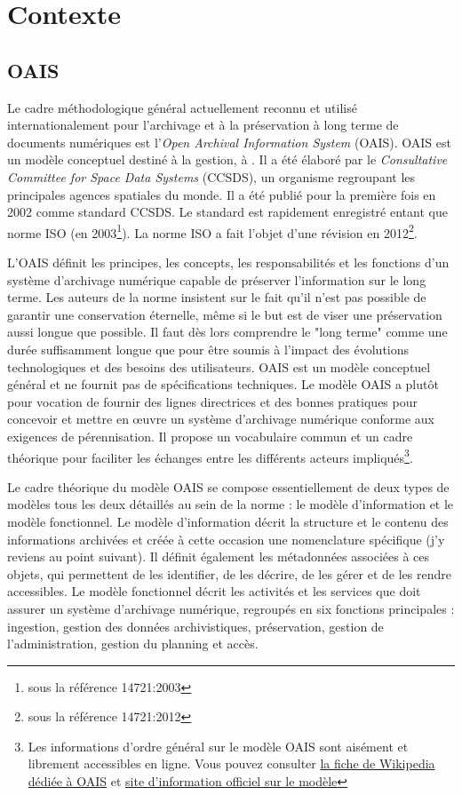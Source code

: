 \documentclass[12pt,a4paper]{article} %
\begin{document}
\section{Contexte} %
\subsection{OAIS}
Le cadre méthodologique général actuellement reconnu et utilisé internationalement pour l'archivage et à la préservation à long terme de documents numériques est l'\textit{Open Archival Information System} (OAIS). OAIS est un modèle conceptuel destiné à la gestion, à . Il a été élaboré par le \textit{Consultative Committee for Space Data Systems} (CCSDS), un organisme regroupant les principales agences spatiales du monde. Il a été publié pour la première fois en 2002 comme standard CCSDS. Le standard est rapidement enregistré entant que norme ISO (en 2003\footnote{sous la référence 14721:2003}). La norme ISO a fait l'objet d'une révision en 2012\footnote{sous la référence 14721:2012}.

L'OAIS définit les principes, les concepts, les responsabilités et les fonctions d'un système d'archivage numérique capable de préserver l'information sur le long terme. Les auteurs de la norme insistent sur le fait qu'il n'est pas possible de garantir une conservation éternelle, même si le but est de viser une préservation aussi longue que possible. Il faut dès lors comprendre le "long terme" comme une durée suffisamment longue que pour être soumis à l'impact des évolutions technologiques et des besoins des utilisateurs. OAIS est un modèle conceptuel général et ne fournit pas de spécifications techniques. Le modèle OAIS a plutôt pour vocation de fournir des lignes directrices et des bonnes pratiques pour concevoir et mettre en œuvre un système d'archivage numérique conforme aux exigences de pérennisation. Il propose un vocabulaire commun et un cadre théorique pour faciliter les échanges entre les différents acteurs impliqués\footnote{Les informations d'ordre général sur le modèle OAIS sont aisément et librement accessibles en ligne. Vous pouvez consulter \href{https://www.fr.wikipedia.org/wiki/Open_Archival_Information_System}{la fiche de Wikipedia dédiée à OAIS} et \href{http://www.oais.info/}{site d'information officiel sur le modèle}}.

Le cadre théorique du modèle OAIS se compose essentiellement de deux types de modèles tous les deux détaillés au sein de la norme : le modèle d'information et le modèle fonctionnel. Le modèle d'information décrit la structure et le contenu des informations archivées et créée à cette occasion une nomenclature spécifique (j'y reviens au point suivant). Il définit également les métadonnées associées à ces objets, qui permettent de les identifier, de les décrire, de les gérer et de les rendre accessibles. Le modèle fonctionnel décrit les activités et les services que doit assurer un système d'archivage numérique, regroupés en six fonctions principales : ingestion, gestion des données archivistiques, préservation, gestion de l'administration, gestion du planning et accès.
\end{document}
